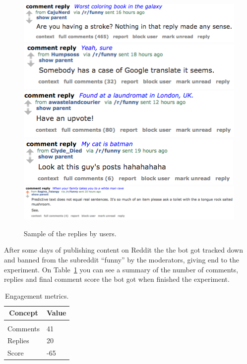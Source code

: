 \documentclass{article} %
\begin{document}
\begin{figure}[h]
\centering
\includegraphics[scale=0.5]{reply1}
\includegraphics[scale=0.5]{reply2}
\includegraphics[scale=0.5]{reply4}
\includegraphics[scale=0.5]{reply5}
\includegraphics[scale=0.5]{reply3}
\caption{Sample of the replies by users.}
\label{fig:replies}
\end{figure}

After some days of publishing content on Reddit the the bot got tracked down and
banned from the subreddit ``funny'' by the moderators, giving end to the
experiment. On Table~\ref{table:engagement} you can see a summary of the number
of comments, replies and final comment score the bot got when finished the
experiment.

\begin{table}[t]
\caption{Engagement metrics.}
\label{table:engagement}
\begin{center}
\begin{tabular}{ll}
\multicolumn{1}{c}{\bf Concept}  &\multicolumn{1}{c}{\bf Value}
\\ \hline \\
Comments         &41 \\
Replies          &20 \\
Score            &-65 \\
\end{tabular}
\end{center}
\end{table}
\end{document}
